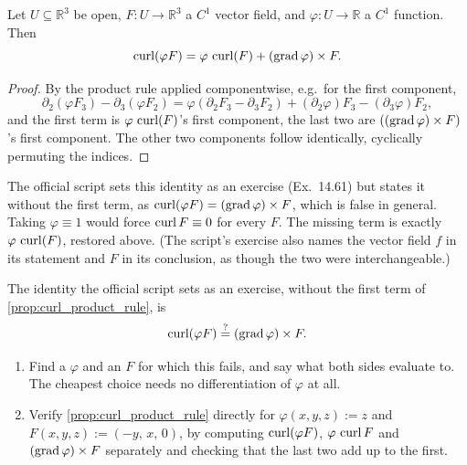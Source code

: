 \begin{proposition}
\label{prop:curl_product_rule}
Let $U \subseteq \mathbb{R}^3$ be open, $F : U \to \mathbb{R}^3$ a $C^1$ vector field, and
$\varphi : U \to \mathbb{R}$ a $C^1$ function. Then
\[\operatorname{curl}(\varphi F) = \varphi\,\operatorname{curl}(F) + (\operatorname{grad}\varphi)\times F.\]
\end{proposition}

\begin{proof}
By the product rule applied componentwise, e.g.\ for the first component,
\[\partial_2(\varphi F_3) - \partial_3(\varphi F_2)
  = \varphi(\partial_2F_3-\partial_3F_2) + (\partial_2\varphi)F_3 - (\partial_3\varphi)F_2,\]
and the first term is $\varphi\,\operatorname{curl}(F)$'s first component, the last two are
$((\operatorname{grad}\varphi)\times F)$'s first component. The other two components follow identically,
cyclically permuting the indices.
\end{proof}

\begin{ainote}
The official script sets this identity as an exercise (Ex.\ 14.61) but states it without the
first term, as $\operatorname{curl}(\varphi F) = (\operatorname{grad}\varphi)\times F$, which is false in general. Taking
$\varphi\equiv1$ would force $\operatorname{curl} F \equiv 0$ for every $F$. The missing term is exactly
$\varphi\,\operatorname{curl}(F)$, restored above. (The script's exercise also names the vector field $f$ in
its statement and $F$ in its conclusion, as though the two were interchangeable.)
\end{ainote}

\begin{aiexercise}
\label{ex:ai_curl_product_rule_counterexample}
The identity the official script sets as an exercise, without the first term of
\cref{prop:curl_product_rule}, is
\[\operatorname{curl}(\varphi F) \overset{?}{=} (\operatorname{grad}\varphi)\times F.\]
\begin{enumerate}[label=\textbf{(\alph*)}]
  \item Find a $\varphi$ and an $F$ for which this fails, and say what both sides evaluate to.
    The cheapest choice needs no differentiation of $\varphi$ at all.
  \item Verify \cref{prop:curl_product_rule} directly for $\varphi(x,y,z) := z$ and
    $F(x,y,z) := (-y,\,x,\,0)$, by computing $\operatorname{curl}(\varphi F)$, $\varphi\,\operatorname{curl} F$ and
    $(\operatorname{grad}\varphi)\times F$ separately and checking that the last two add up to the first.
\end{enumerate}
\end{aiexercise}

